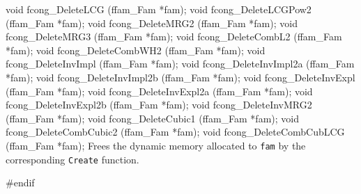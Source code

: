 \code

void fcong_DeleteLCG     (ffam_Fam *fam);
void fcong_DeleteLCGPow2 (ffam_Fam *fam);
void fcong_DeleteMRG2    (ffam_Fam *fam);
void fcong_DeleteMRG3    (ffam_Fam *fam);
void fcong_DeleteCombL2  (ffam_Fam *fam);
void fcong_DeleteCombWH2 (ffam_Fam *fam);
void fcong_DeleteInvImpl   (ffam_Fam *fam);
void fcong_DeleteInvImpl2a (ffam_Fam *fam);
void fcong_DeleteInvImpl2b (ffam_Fam *fam);
void fcong_DeleteInvExpl   (ffam_Fam *fam);
void fcong_DeleteInvExpl2a (ffam_Fam *fam);
void fcong_DeleteInvExpl2b (ffam_Fam *fam);
void fcong_DeleteInvMRG2   (ffam_Fam *fam);
void fcong_DeleteCubic1    (ffam_Fam *fam);
void fcong_DeleteCombCubic2  (ffam_Fam *fam);
void fcong_DeleteCombCubLCG  (ffam_Fam *fam);
\endcode
\tab
 Frees the dynamic memory allocated to {\tt fam} by the corresponding
 {\tt Create} function.
\endtab

\code

\hide
#endif
\endhide
\endcode
